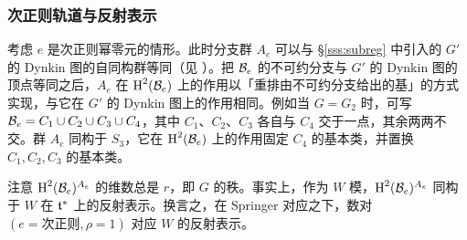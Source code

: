 \subsubsection{次正则轨道与反射表示}\label{sss:subreg Spr corr} 考虑 $e$ 是次正则幂零元的情形。此时分支群 $A_{e}$ 可以与 \S\ref{sss:subreg} 中引入的 $G'$ 的 Dynkin 图的自同构群等同（见 \cite[\S7.5, Proposition]{Slodowy}）。把 $\mathcal{B}_{e}$ 的不可约分支与 $G'$ 的 Dynkin 图的顶点等同之后，$A_{e}$ 在 $\textup{H}^{2}({\mathcal{B}_{e}})$ 上的作用以「重排由不可约分支给出的基」的方式实现，与它在 $G'$ 的 Dynkin 图上的作用相同。例如当 $G=G_{2}$ 时，可写 $\mathcal{B}_{e}=C_{1}\cup C_{2}\cup C_{3}\cup C_{4}$，其中 $C_{1}$、$C_{2}$、$C_{3}$ 各自与 $C_{4}$ 交于一点，其余两两不交。群 $A_{e}$ 同构于 $S_{3}$，它在 $\textup{H}^{2}({\mathcal{B}_{e}})$ 上的作用固定 $C_{4}$ 的基本类，并置换 $C_{1}, C_{2}, C_{3}$ 的基本类。

注意 $\textup{H}^{2}({\mathcal{B}_{e}})^{A_{e}}$ 的维数总是 $r$，即 $G$ 的秩。事实上，作为 $W$ 模，$\textup{H}^{2}({\mathcal{B}_{e}})^{A_{e}}$ 同构于 $W$ 在 $\mathfrak{t}^{*}$ 上的反射表示。换言之，在 Springer 对应之下，数对 $(e=\text{次正则}, \rho=1)$ 对应 $W$ 的反射表示。
